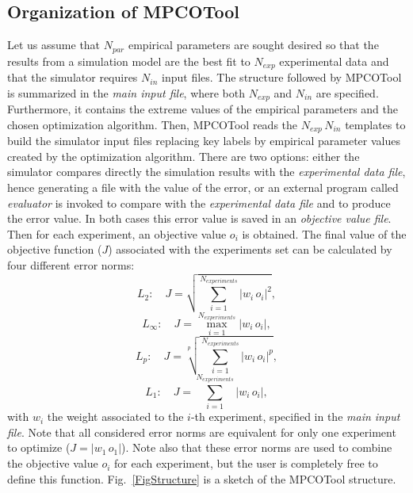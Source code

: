 \documentclass[review,authoryear]{elsarticle}
\newcommand{\EQ}[2]
{\begin{equation}#1\label{#2}\end{equation}}
\newcommand{\PSPICTURE}[7]
{
	\begin{figure}[ht!]
		\centering
		\pspicture(#1,#2)(#3,#4)
			#5
		\endpspicture
		\caption{#6.\label{#7}}
	\end{figure}
}
\newcommand{\ABS}[1]{\left|#1\right|}
\begin{document}
\subsection{Organization of MPCOTool}

Let us assume that $N_{par}$ empirical parameters are sought desired so
that the results from a simulation model are the best fit to $N_{exp}$
experimental data and that the simulator requires $N_{in}$ input files. The
structure followed by MPCOTool is summarized in the \emph{main input file},
where both $N_{exp}$ and $N_{in}$ are specified. Furthermore, it
contains the extreme values of the empirical parameters and the chosen
optimization algorithm. Then, MPCOTool reads the
$N_{exp}\,N_{in}$ templates to build the simulator input files
replacing key labels by empirical parameter values created by the optimization
algorithm. There are two options: either the simulator compares directly the
simulation results with the \emph{experimental data file}, hence generating a
file with the value of the error, or an external program called \emph{evaluator}
is invoked to compare with the \emph{experimental data file} and to produce the
error value. In both cases this error value is saved in an
\emph{objective value file}. Then for each experiment, an objective value $o_i$
is obtained. The final value of the objective function ($J$) associated with the
experiments set can be calculated by four different error norms:
\EQ{L_2:\quad J=\sqrt{\sum_{i=1}^{N_{experiments}}\ABS{w_i\,o_i}^2},}
{EqObjectiveFunctionLII}
\EQ{L_\infty:\quad J=\max_{i=1}^{N_{experiments}}\ABS{w_i\,o_i},}
{EqObjectiveFunctionLi}
\EQ{L_p:\quad J=\sqrt[p]{\sum_{i=1}^{N_{experiments}}\ABS{w_i\,o_i}^p},}
{EqObjectiveFunctionLp}
\EQ{L_1:\quad J=\sum_{i=1}^{N_{experiments}}\ABS{w_i\,o_i},}
{EqObjectiveFunctionLI}
with $w_i$ the weight associated to the $i$-th experiment, specified in the
\emph{main input file}.
Note that all considered error norms are equivalent for only one experiment to
optimize ($J=\ABS{w_1\,o_1}$).
Note also that these error norms are used to combine the objective value $o_i$
for each experiment, but the user is completely free to define this function.
Fig.~\ref{FigStructure} is a sketch of the MPCOTool structure.
\end{document}

